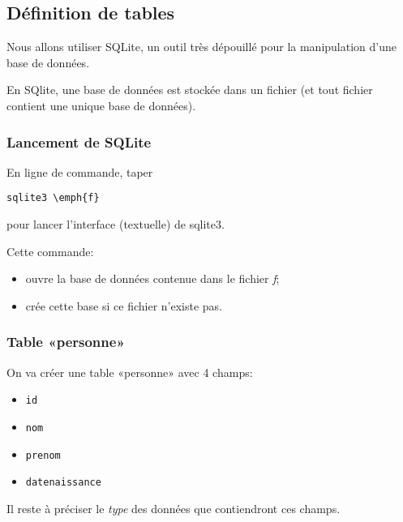 \subsection{Définition de tables}

Nous allons utiliser SQLite, un outil très dépouillé pour la
manipulation d'une base de données.

En SQlite, une base de données est stockée dans un fichier (et tout
fichier contient une unique base de données).

\subsubsection{Lancement de SQLite}

En ligne de commande, taper
\begin{Verbatim}[commandchars=\\\{\}]
sqlite3 \emph{f}
\end{Verbatim}
pour lancer l'interface (textuelle) de sqlite3.

Cette  commande:
\begin{itemize}
\item  ouvre  la base  de  données contenue  dans le  fichier
\emph{f};
\item crée cette base si ce fichier n'existe pas.
\end{itemize}

\subsubsection{Table «personne»}

On va créer une table «personne» avec 4 champs:
\begin{itemize}
\item \verb+id+
\item \verb+nom+
\item \verb+prenom+
\item \verb+datenaissance+
\end{itemize}

Il reste à préciser le \emph{type} des données que contiendront ces
champs.

